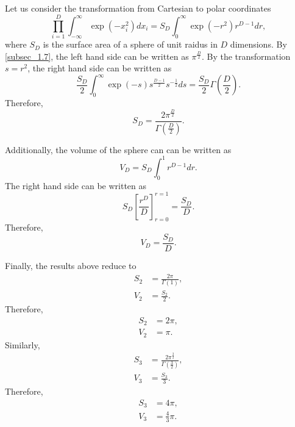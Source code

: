\subsection{}
\label{subsec_1.18}
Let us consider the transformation from Cartesian to polar coordinates
%
\begin{equation}
\prod_{i = 1}^{D} \int_{- \infty}^{\infty} \exp \left( - x_i ^ 2 \right) dx_i = S_D \int_{0}^{\infty} \exp \left( - r ^ 2 \right) r ^ {D - 1} dr,
\end{equation}
%
where $S_D$ is the surface area of a sphere of unit raidus in $D$ dimensions. 
By \ref{subsec_1.7}, the left hand side can be written as $\pi ^ \frac{D}{2}$. By the transformation $s = r ^ 2$, the right hand side can be written as
%
\begin{equation}
\frac{S_D}{2} \int_0^\infty \exp(- s) s ^ \frac{D - 1}{2} s ^ {- \frac{1}{2}} ds = \frac{S_D}{2} \Gamma \left( \frac{D}{2} \right).
\end{equation}
%
Therefore,
%
\begin{equation}
S_D = \frac{2 \pi ^ \frac{D}{2}}{\Gamma \left( \frac{D}{2} \right)}.
\end{equation}
%

Additionally, the volume of the sphere can can be written as
%
\begin{equation}
V_D = S_D \int_{0}^{1} r^{D - 1} dr.
\end{equation}
%
The right hand side can be written as 
%
\begin{equation}
S_D \left[ \frac{r ^ D}{D} \right]_{r = 0}^{r = 1} = \frac{S_D}{D}.
\end{equation}
%
Therefore, 
%
\begin{equation}
V_D = \frac{S_D}{D}.
\end{equation}
%

Finally, the results above reduce to
%
\begin{equation}
\begin{aligned}
S_2 &= \frac{2 \pi}{\Gamma(1)}, \\
V_2 &= \frac{S_2}{2}. 
\end{aligned}
\end{equation}
%
Therefore, 
%
\begin{equation}
\begin{aligned}
S_2 &= 2 \pi, \\
V_2 &= \pi. 
\end{aligned}
\end{equation}
%
Similarly,
%
\begin{equation}
\begin{aligned}
S_3 &= \frac{2 \pi ^ \frac{3}{2}}{\Gamma \left( \frac{3}{2} \right)}, \\
V_3 &= \frac{S_3}{3}. 
\end{aligned}
\end{equation}
%
Therefore, 
%
\begin{equation}
\begin{aligned}
S_3 &= 4 \pi, \\
V_3 &= \frac{4}{3} \pi. 
\end{aligned}
\end{equation}
%


